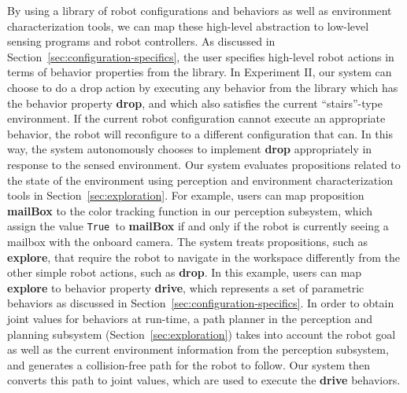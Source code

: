 \documentclass[12pt]{article}
\newcommand{\lt}{{\tt True }}
\begin{document}
By using a library of robot configurations and behaviors as well as environment characterization tools, we can map these high-level abstraction to low-level sensing programs and robot controllers.
As discussed in Section~\ref{sec:configuration-specifics}, the user specifies high-level robot actions in terms of behavior properties from the library. 
In Experiment II, our system can choose to do a drop action by executing any behavior from the library which has the behavior property \textbf{drop}, and which also satisfies the current ``stairs''-type environment. If the current robot configuration cannot execute an appropriate behavior, the robot will reconfigure to a different configuration that can.  In this way, the system autonomously chooses to implement  \textbf{drop}  appropriately in response to the sensed environment.
Our system evaluates propositions related to the state of the environment using perception and environment characterization tools in Section~\ref{sec:exploration}. For example, users can map proposition \textbf{mailBox} to the color tracking function in our perception subsystem, which assign the value \lt to \textbf{mailBox} if and only if the robot is currently seeing a mailbox with the onboard camera.
The system treats propositions, such as \textbf{explore}, that require the robot to navigate in the workspace differently from the other simple robot actions, such as \textbf{drop}.
In this example, users can map \textbf{explore} to behavior property \textbf{drive}, which represents a set of parametric behaviors as discussed in Section~\ref{sec:configuration-specifics}.
In order to obtain joint values for behaviors at run-time, a path planner in the perception and planning subsystem (Section~\ref{sec:exploration}) takes into account the robot goal as well as the current environment information from the perception subsystem, and generates a collision-free path for the robot to follow.
Our system then converts this path to joint values, which are used to execute the \textbf{drive} behaviors.

\end{document}
